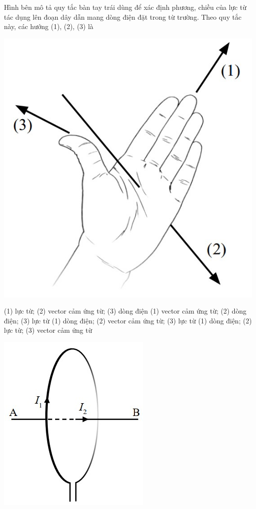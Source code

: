 \begin{ex}
	Hình bên mô tả quy tắc bàn tay trái dùng để xác định phương, chiều của lực từ tác dụng lên đoạn dây dẫn mang dòng điện đặt trong từ trường. Theo quy tắc này, các hướng (1), (2), (3) là
	\begin{center}
		\includegraphics[width=0.2\linewidth]{figs/VN12-Y24-PH-SYL-025P-3}
	\end{center}
	\choice
	{(1) lực từ; (2) vector cảm ứng từ; (3) dòng điện}
	{(1) vector cảm ứng từ; (2) dòng điện; (3) lực từ}
	{\True (1) dòng điện; (2) vector cảm ứng từ; (3) lực từ}
	{(1) dòng điện; (2) lực từ; (3) vector cảm ứng từ}
	\loigiai{}
\end{ex}
\begin{ex}
	{
		\includegraphics[width=0.45\linewidth]{figs/VN12-Y24-PH-SYL-025P-4}
	}
	\loigiai{}
\end{ex}
